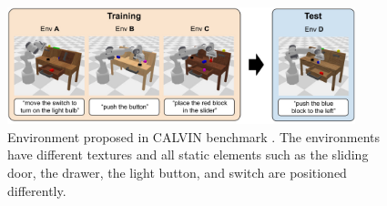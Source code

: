 \begin{figure}[t]
    \centering
    \includegraphics[width=0.9\textwidth]{figures/images/calvin/calvin_env.jpg}
    \caption{Environment proposed in CALVIN benchmark \cite{calvin}. The environments have different textures and all static elements such as the sliding door, the drawer, the light button, and switch are positioned differently.}
    \label{fig:calvin_env}
\end{figure}